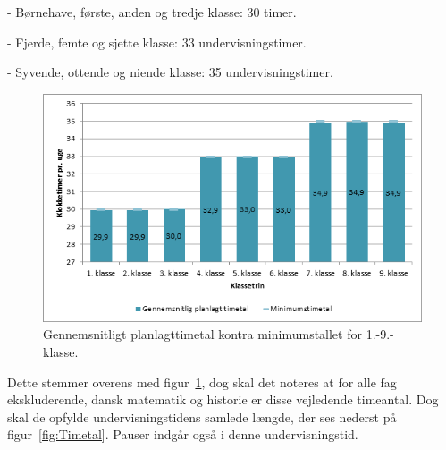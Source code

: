 -         Børnehave, første, anden og tredje klasse: 30 timer.

-         Fjerde, femte og sjette klasse: 33 undervisningstimer.

-         Syvende, ottende og niende klasse: 35 undervisningstimer.

\begin{figure}[!ht]
  \centering
  \includegraphics[width=\textwidth]{partials/graphics/planlagttime.png}
  \caption{Gennemsnitligt planlagttimetal kontra minimumstallet for 1.-9.-klasse.}
  \label{fig:ugetal}
\end{figure}

Dette stemmer overens med figur~\ref{fig:ugetal}, dog skal det noteres at for alle fag ekskluderende, dansk matematik og historie  er disse vejledende timeantal. Dog skal de opfylde undervisningstidens samlede længde, der ses nederst på figur~\ref{fig:Timetal}. Pauser indgår også i denne undervisningstid.

